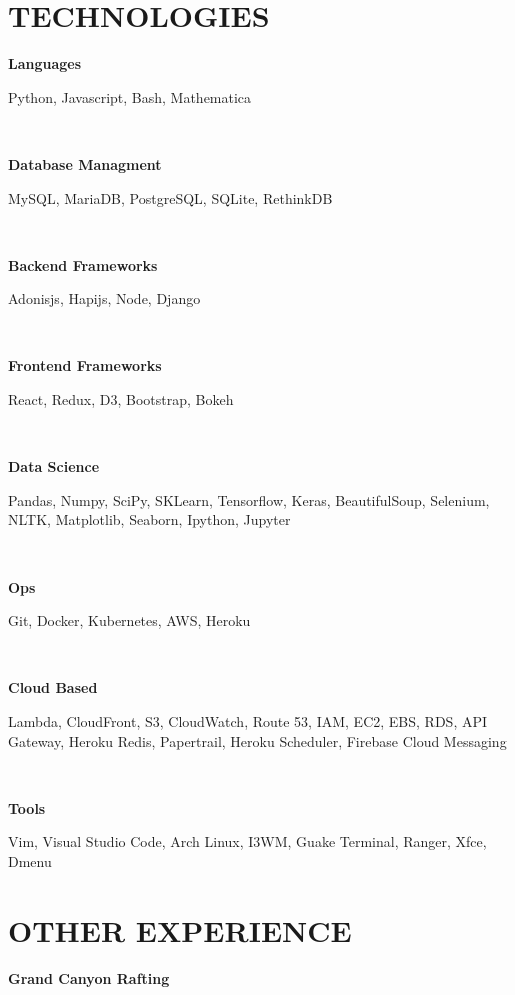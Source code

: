 \documentclass[12pt]{resume}
\begin{document}
    \hspace{10mm}
    \begin{minipage}[t]{0.48\textwidth}
        \begin{spacing}{1.05}
        {\section* {TECHNOLOGIES}}
        { \par \bf Languages }
        { \par Python, Javascript, Bash, Mathematica}\\
        { \par \bf Database Managment }
        { \par MySQL, MariaDB, PostgreSQL, SQLite, RethinkDB}\\
        { \par \bf Backend Frameworks }
        { \par Adonisjs, Hapijs, Node, Django}\\
        { \par \bf Frontend Frameworks}
        { \par React, Redux, D3, Bootstrap, Bokeh}\\
        { \par \bf Data Science}
        { \par Pandas, Numpy, SciPy, SKLearn, Tensorflow, Keras, 
        BeautifulSoup, Selenium, NLTK, Matplotlib, Seaborn, Ipython, Jupyter}\\
        { \par \bf Ops}
        { \par Git, Docker, Kubernetes, AWS, Heroku}\\
        { \par \bf Cloud Based}
        { \par Lambda, CloudFront, S3, CloudWatch, Route 53, IAM, EC2, EBS,
        RDS, API Gateway, Heroku Redis, Papertrail, Heroku Scheduler, Firebase
        Cloud Messaging}\\
        { \par \bf Tools }
        { \par Vim, Visual Studio Code, Arch Linux, I3WM, Guake Terminal, Ranger, Xfce,
        Dmenu}
        {\section* {OTHER EXPERIENCE}}
            {\par \bf Grand Canyon Rafting}
            \vspace{1.5mm}

\end{spacing}
\end{minipage}
\end{document}
